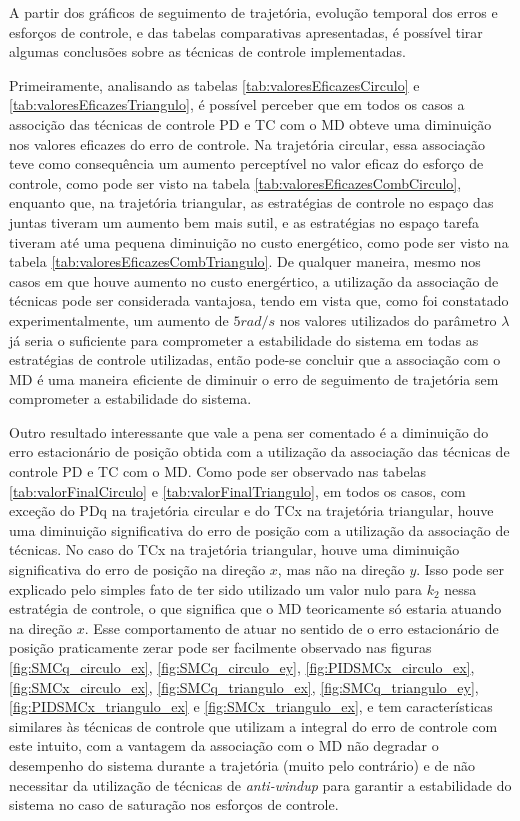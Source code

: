 \documentclass[]{politex}
\begin{document}
A partir dos gráficos de seguimento de trajetória, evolução temporal dos erros e esforços de controle, e das tabelas comparativas apresentadas, é possível tirar algumas conclusões sobre as técnicas de controle implementadas.

Primeiramente, analisando as tabelas \ref{tab:valoresEficazesCirculo} e \ref{tab:valoresEficazesTriangulo}, é possível perceber que em todos os casos a associção das técnicas de controle PD e TC com o MD obteve uma diminuição nos valores eficazes do erro de controle. Na trajetória circular, essa associação teve como consequência um aumento perceptível no valor eficaz do esforço de controle, como pode ser visto na tabela \ref{tab:valoresEficazesCombCirculo}, enquanto que, na trajetória triangular, as estratégias de controle no espaço das juntas tiveram um aumento bem mais sutil, e as estratégias no espaço tarefa tiveram até uma pequena diminuição no custo energético, como pode ser visto na tabela \ref{tab:valoresEficazesCombTriangulo}. De qualquer maneira, mesmo nos casos em que houve aumento no custo energértico, a utilização da associação de técnicas pode ser considerada vantajosa, tendo em vista que, como foi constatado experimentalmente, um aumento de $5rad/s$ nos valores utilizados do parâmetro $\lambda$  já seria o suficiente para comprometer a estabilidade do sistema em todas as estratégias de controle utilizadas, então pode-se concluir que a associação com o MD é uma maneira eficiente de diminuir o erro de seguimento de trajetória sem comprometer a estabilidade do sistema.  

Outro resultado interessante que vale a pena ser comentado é a diminuição do erro estacionário de posição obtida com a utilização da associação das técnicas de controle PD e TC com o MD. Como pode ser observado nas tabelas \ref{tab:valorFinalCirculo} e \ref{tab:valorFinalTriangulo}, em todos os casos, com exceção do PDq na trajetória circular e do TCx na trajetória triangular, houve uma diminuição significativa do erro de posição com a utilização da associação de técnicas. No caso do TCx na trajetória triangular, houve uma diminuição significativa do erro de posição na direção $x$, mas não na direção $y$. Isso pode ser explicado pelo simples fato de ter sido utilizado um valor nulo para $k_2$ nessa estratégia de controle, o que significa que o MD teoricamente só estaria atuando na direção $x$. Esse comportamento de atuar no sentido de o erro estacionário de posição praticamente zerar pode ser facilmente observado nas figuras \ref{fig:SMCq_circulo_ex}, \ref{fig:SMCq_circulo_ey}, \ref{fig:PIDSMCx_circulo_ex}, \ref{fig:SMCx_circulo_ex}, \ref{fig:SMCq_triangulo_ex}, \ref{fig:SMCq_triangulo_ey}, \ref{fig:PIDSMCx_triangulo_ex} e \ref{fig:SMCx_triangulo_ex}, e tem características similares às técnicas de controle que utilizam a integral do erro de controle com este intuito, com a vantagem da associação com o MD não degradar o desempenho do sistema durante a trajetória (muito pelo contrário) e de não necessitar da utilização de técnicas de \emph{anti-windup} para garantir a estabilidade do sistema no caso de saturação nos esforços de controle.
\end{document}
